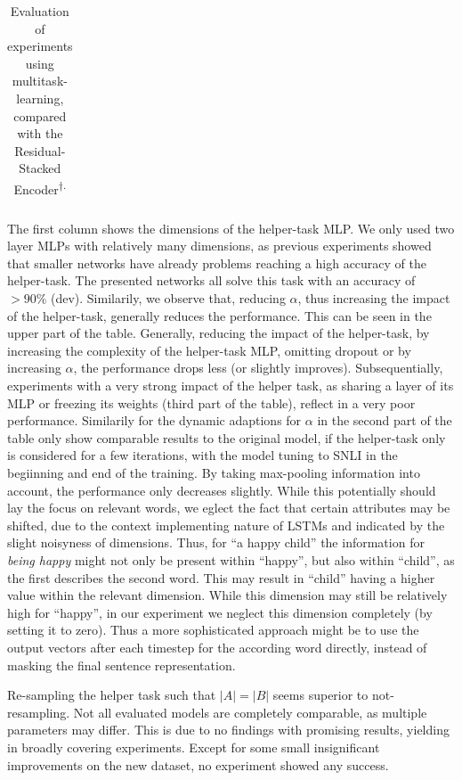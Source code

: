 \begin{table}[tph!]
\begin{tabular}{rccc|cr|cr}
\end{tabular}
\caption{Evaluation of experiments using multitask-learning, compared with the Residual-Stacked Encoder\textsuperscript{$\dagger$.}}
\label{tab:mt_evaluation}
\end{table}
The first column shows the dimensions of the helper-task \ac{MLP}. We only used two layer \ac{MLP}s with relatively many dimensions, as previous experiments showed that smaller networks have already problems reaching a high accuracy of the helper-task. The presented networks all solve this task with an accuracy of $> 90 \%$ (dev). Similarily, we observe that, reducing  $\alpha$, thus increasing the impact of the helper-task, generally reduces the performance. This can be seen in the upper part of the table. Generally, reducing the impact of the helper-task, by increasing the complexity of the helper-task \ac{MLP}, omitting dropout or by increasing $\alpha$, the performance drops less (or slightly improves). Subsequentially, experiments with a very strong impact of the helper task, as sharing a layer of its \ac{MLP} or freezing its weights (third part of the table), reflect in a very poor performance. Similarily for the dynamic adaptions for $\alpha$ in the second part of the table only show comparable results to the original model, if the helper-task only is considered for a few iterations, with the model tuning to \ac{SNLI} in the begiinning and end of the training. By taking max-pooling information into account, the performance only decreases slightly. While this potentially should lay the focus on relevant words, we eglect the fact that certain attributes may be shifted, due to the context implementing nature of \ac{LSTM}s and indicated by the slight noisyness of dimensions. Thus, for ``a happy child'' the information for \textit{being happy} might not only be present within ``happy'', but also within ``child'', as the first describes the second word. This may result in ``child'' having a higher value within the relevant dimension. While this dimension may still be relatively high for ``happy'', in our experiment we neglect this dimension completely (by setting it to zero). Thus a more sophisticated approach might be to use the output vectors after each timestep for the according word directly, instead of masking the final sentence representation.
\newline

\noindent
Re-sampling the helper task such that $|A| = |B|$ seems superior to not-resampling. Not all evaluated models are completely comparable, as multiple parameters may differ. This is due to no findings with promising results, yielding in broadly covering experiments. Except for some small insignificant improvements on the new dataset, no experiment showed any success.


